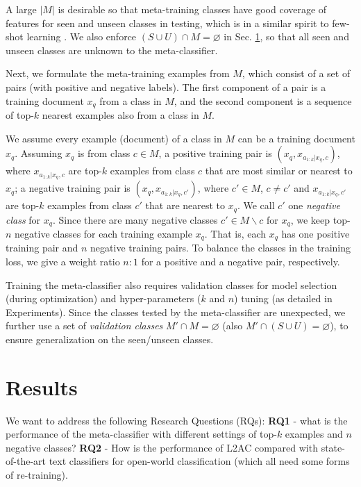 A large $|M|$ is desirable so that meta-training classes have good coverage of features for seen and unseen classes in testing, which is in a similar spirit to few-shot learning \cite{lake2011one}. 
We also enforce $ (S\cup U) \cap M=\varnothing$ in Sec. \ref{chap2:sec:exp}, so that all seen and unseen classes are unknown to the meta-classifier.

Next, we formulate the meta-training examples from $M$, which consist of a set of pairs 
(with positive and negative labels). 
The first component of a pair is a training document $x_q$ from a class in $M$, and the second component is a sequence of top-$k$ nearest examples also from a class in $M$. 

We assume every example (document) of a class in $M$ can be a training document $x_q$.
Assuming $x_q$ is from class $c \in M$,
a positive training pair is $(x_q, x_{a_{1:k}|x_q, c})$, where $x_{a_{1:k}|x_q, c}$ are top-$k$ examples from class $c$ that are most similar or nearest to $x_q$;
a negative training pair is $(x_q, x_{a_{1:k}|x_q, c'})$, where $c' \in M$, $c \neq c'$ and $x_{a_{1:k}|x_q, c'}$ are top-$k$ examples from class $c'$ that are nearest to $x_q$.
We call $c'$ one \emph{negative class} for $x_q$.
Since there are many negative classes $c' \in M\backslash c$ for $x_q$, we keep top-$n$ negative classes for each training example $x_q$. 
That is, each $x_q$ has one positive training pair and $n$ negative training pairs.
To balance the classes in the training loss, we give a weight ratio $n:1$ for a positive and a negative pair, respectively.

Training the meta-classifier also requires validation classes for model selection (during optimization) and hyper-parameters ($k$ and $n$) tuning (as detailed in Experiments).
Since the classes tested by the meta-classifier are unexpected, we further use a set of  \textit{validation classes} $M'\cap M=\varnothing$ (also $M'\cap (S\cup U)=\varnothing$), to ensure generalization on the seen/unseen classes.

\section{Results}
\label{chap2:sec:exp}

We want to address the following Research Questions (RQs):
\textbf{RQ1} - what is the performance of the meta-classifier with different settings of top-$k$ examples and $n$ negative classes?
\textbf{RQ2} - How is the performance of L2AC compared with state-of-the-art text classifiers for open-world classification (which all need some forms of re-training).

